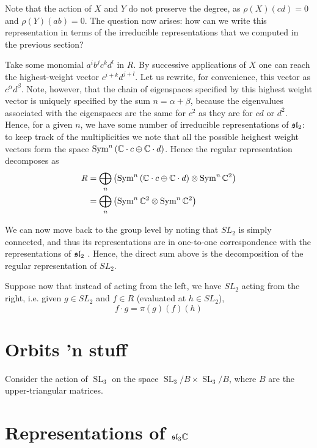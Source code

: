 \documentclass{../mathnotes}
\DeclareMathOperator{\SL}{SL}
\begin{document}
Note that the action of $X$ and $Y$ do not preserve the degree, as $\rho(X)(cd)=0$ and $\rho(Y)(ab)=0$.
The question now arises: how can we write this representation in terms of the irreducible representations that we
computed in the previous section?

Take some monomial $a^ib^jc^kd^l$ in $R$. By successive applications of $X$ one can reach the highest-weight vector
$c^{i+k}d^{j+l}$. Let us rewrite, for convenience, this vector as $c^{\alpha}d^{\beta}$. Note, however, that the chain of eigenspaces
specified by this highest weight vector is uniquely specified by the sum $n=\alpha+\beta$, because the eigenvalues associated with the
eigenspaces are the same for $c^2$ as they are for $cd$ or $d^2$. Hence, for a given $n$, we have some number of irreducible representations of $\mathfrak{sl}_2$:
to keep track of the multiplicities we note that all the possible heighest weight vectors form the space $\operatorname{Sym}^n\left( \mathbb{C}\cdot c\oplus\mathbb{C}\cdot d\right)$. Hence
the regular representation decomposes as
\begin{align*}
    R&=\bigoplus_n\left( \operatorname{Sym}^n\left( \mathbb{C}\cdot c\oplus\mathbb{C}\cdot d\right)\otimes\operatorname{Sym}^n\mathbb{C}^2\right)\\
    &=\bigoplus_n\left(\operatorname{Sym}^n\mathbb{C}^2 \otimes\operatorname{Sym}^n\mathbb{C}^2\right)
\end{align*}

We can now move back to the group level by noting that $SL_2$ is simply connected, and thus its representations are
in one-to-one correspondence with the representations of $\mathfrak{sl}_2$ \cite{F-H}. Hence, the direct sum above is the decomposition of
the regular representation of $SL_2$.

Suppose now that instead of acting from the left, we have $SL_2$ acting from the right, i.e. given $g\in SL_2$ and $f\in R$
(evaluated at $h\in SL_2$),
\[f\cdot g=\pi(g)(f)(h)\]


\section{Orbits 'n stuff}

Consider the action of $\SL_3$ on the space $\SL_3/B\times\SL_3/B$, where $B$ are the upper-triangular matrices.




\section{Representations of $\mathfrak{sl}_3\mathbb{C}$}
\end{document}
